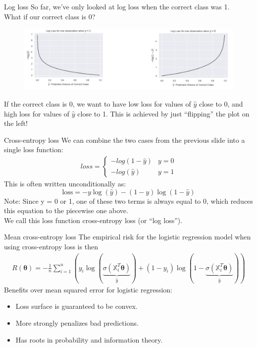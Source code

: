 \documentclass[aspectratio=169]{../latex_main/tntbeamer}  %
\begin{document}
	\begin{frame}{Log loss}
	    So far, we’ve only looked at log loss when the correct class was 1. \\
	    What if our correct class is 0?
        \begin{figure}
            \centering
            \includegraphics[scale=.33]{Bild20}
        \end{figure}
	    If the correct class is 0, we want to have low loss for values of   $\hat{y}$   close to 0, and high loss for values of   $\hat{y}$    close to 1. This is achieved by just “flipping” the plot on the left!
	\end{frame}
	
	
	\begin{frame}{Cross-entropy loss}
	    We can combine the two cases from the previous slide into a single loss function:
	    \begin{align*}
	        loss = \left\{\begin{array}{cc}
	            -log(1 - \hat{y}) & y = 0  \\
	            -log(\hat{y}) & y= 1 
	        \end{array}\right.
	    \end{align*}
	    This is often written unconditionally as:
	    \begin{equation*}
	        \text{loss} = -y\log (\hat{y}) - (1 - y) \log (1 - \hat{y})
	    \end{equation*}
	    Note: Since y = 0 or 1, one of these two terms is always equal to 0, which reduces this equation to the piecewise one above.\\
	    \bigskip
	    We call this loss function \alert{cross-entropy loss} (or “log loss”).
	\end{frame}
	
	\begin{frame}{Mean cross-entropy loss}
	    The empirical risk for the logistic regression model when using cross-entropy loss is then
	    \begin{align*}
	        R(\bm{\theta}) = -\frac{1}{n}\sum\limits_{i=1}^n(y_i\log (\underbrace{\sigma (\mathbb{X}_i^T\bm{\theta})}_{\hat{y}}) + (1 - y_i)\log (1 - \underbrace{\sigma (\mathbb{X}_i^T\bm{\theta})}_{\hat{y}}))
	    \end{align*}
	    Benefits over mean squared error for logistic regression:
	    \begin{itemize}
	        \item Loss surface is guaranteed to be convex.
	        \item More strongly penalizes bad predictions.
	        \item Has roots in probability and information theory.
	    \end{itemize}
	\end{frame}
	
\end{document}
